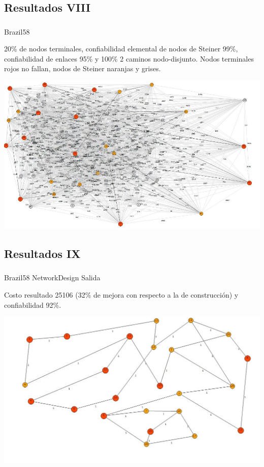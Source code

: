 \subsection{Resultados VIII}
\begin{frame}\frametitle{}
\begin{block}{Brazil58}
\begin{scriptsize}
20\% de nodos terminales, confiabilidad elemental de nodos de Steiner 99\%, confiabilidad de enlaces 95\% y 100\% 2 caminos nodo-disjunto. Nodos terminales rojos no fallan, nodos de Steiner naranjas y grises.
\end{scriptsize}
\begin{center}
   \includegraphics[scale=0.35]{figuras/1}
\end{center}
\end{block}
\end{frame}

\subsection{Resultados IX}
\begin{frame}\frametitle{}
\begin{block}{Brazil58 NetworkDesign Salida}
\begin{scriptsize}
Costo resultado 25106 (32\% de mejora con respecto a la de construcción) y confiabilidad 92\%. 
\end{scriptsize}
\begin{center}
   \includegraphics[scale=0.35]{figuras/2}
\end{center}
\end{block}
\end{frame}

